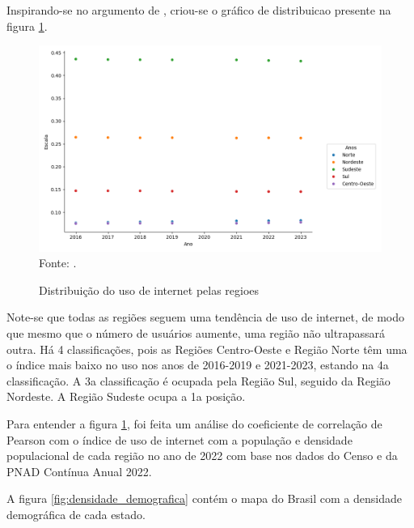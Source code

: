 Inspirando-se no argumento de \cite{HAMAM_2017}, criou-se o gráfico de distribuicao presente na figura \ref{fig:distribuicao_uso_internet_regioes}.

\begin{figure}[H]
    \centering
    \caption{Distribuição do uso de internet pelas regioes}
    \includegraphics[width=1\linewidth]{figuras/internet/distribuicao_uso_internet_regioes.png}
    \label{fig:distribuicao_uso_internet_regioes}
    \footnotesize{Fonte: \cite{pnda_continua_anual_2016_2023}.}
\end{figure}

Note-se que todas as regiões seguem uma tendência de uso de internet, de modo que mesmo que o número de usuários aumente, uma região não ultrapassará outra. Há 4 classificações, pois as Regiões Centro-Oeste e Região Norte têm uma o índice mais baixo no uso nos anos de 2016-2019 e 2021-2023, estando na 4a classificação. A 3a classificação é ocupada pela Região Sul, seguido da Região Nordeste. A Região Sudeste ocupa a 1a posição.

Para entender a figura \ref{fig:distribuicao_uso_internet_regioes}, foi feita um análise do coeficiente de correlação de Pearson com o índice de uso de internet com a população e densidade populacional de cada região no ano de 2022 com base nos dados do Censo e da PNAD Contínua Anual 2022.

A figura \ref{fig:densidade_demografica} contém o mapa do Brasil com a densidade demográfica de cada estado.

